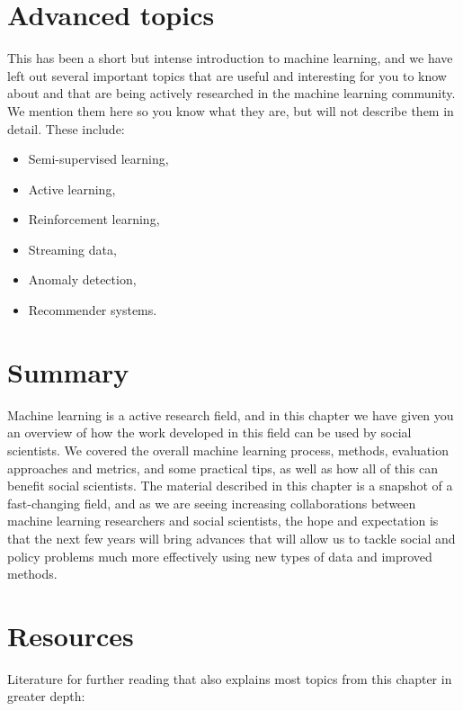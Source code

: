 \documentclass[]{krantz}
\begin{document}
\section{Advanced topics}\label{advanced-topics}

This has been a short but intense introduction to machine learning, and
we have left out several important topics that are useful and
interesting for you to know about and that are being actively researched
in the machine learning community. We mention them here so you know what
they are, but will not describe them in detail. These include:

\begin{itemize}
\item
  Semi-supervised learning,
\item
  Active learning,
\item
  Reinforcement learning,
\item
  Streaming data,
\item
  Anomaly detection,
\item
  Recommender systems.
\end{itemize}

\section{Summary}\label{summary-3}

Machine learning is a active research field, and in this chapter we have
given you an overview of how the work developed in this field can be
used by social scientists. We covered the overall machine learning
process, methods, evaluation approaches and metrics, and some practical
tips, as well as how all of this can benefit social scientists. The
material described in this chapter is a snapshot of a fast-changing
field, and as we are seeing increasing collaborations between machine
learning researchers and social scientists, the hope and expectation is
that the next few years will bring advances that will allow us to tackle
social and policy problems much more effectively using new types of data
and improved methods.

\hypertarget{ml:res}{\section{Resources}\label{ml:res}}

Literature for further reading that also explains most topics from this
chapter in greater depth:
\end{document}
